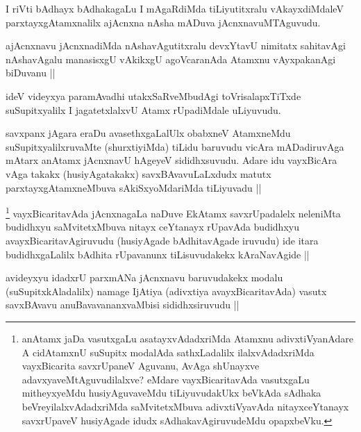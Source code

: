 
\begin{artha}
I riVti bAdhayx bAdhakagaLu I mAgaRdiMda tiLiyutitxralu vAkayxdiMdaleV parxtayxgAtamxnalilx ajAcnxna nAsha mADuva jAcnxnavuMTAguvudu.
\end{artha}

\begin{artha}
ajAcnxnavu jAcnxnadiMda nAshavAgutitxralu devxYtavU nimitatx sahitavAgi nAshavAgalu manasisxgU vAkikxgU agoVcaranAda Atamxnu vAyxpakanAgi biDuvanu ||
\end{artha}

\begin{artha}
ideV videyxya paramAvadhi utakxSaRveMbudAgi toVrisalapxTiTxde suSupitxyalilx I jagatetxlalxvU Atamx rUpadiMdale uLiyuvudu.
\end{artha}


\begin{artha}
savxpanx jAgara eraDu avasethxgaLalUlx obabxneV AtamxneMdu suSupitxyalilxruvaMte (shurxtiyiMda) tiLidu baruvudu vicAra mADadiruvAga mAtarx anAtamx jAcnxnavU hAgeyeV sididhxsuvudu. Adare idu vayxBicAra vAga takakx (husiyAgatakakx) savxBAvavuLaLxdudx matutx parxtayxgAtamxneMbuva sAkiSxyoMdariMda tiLiyuvadu ||
\end{artha}

\begin{artha}
\footnote{anAtamx jaDa vasutxgaLu asatayxvAdadxriMda Atamxnu adivxtiVyanAdare A cidAtamxnU suSupitx modalAda sathxLadalilx ilalxvAdadxriMda vayxBicarita savxrUpaneV Aguvanu, AvAga shUnayxve adavxyaveMtAguvudilalxve? eMdare vayxBicaritavAda vasutxgaLu mitheyxyeMdu husiyAguvaveMdu tiLiyuvudakUkx beVkAda sAdhaka beVreyilalxvAdadxriMda saMvitetxMbuva adivxtiVyavAda nitayxceYtanayx savxrUpaveV husiyAgade idudx sAdhakavAgiruvudeMdu opapxbeVku.}
vayxBicaritavAda jAcnxnagaLa naDuve EkAtamx savxrUpadalelx neleniMta budidhxyu saMvitetxMbuva nitayx ceYtanayx rUpavAda budidhxyu avayxBicaritavAgiruvudu (husiyAgade bAdhitavAgade iruvudu) ide itara budidhxgaLalilx bAdhita rUpavanunx tiLisuvudakekx kAraNavAgide ||
\end{artha}


\begin{artha}
avideyxyu idadxrU parxmANa jAcnxnavu baruvudakekx modalu (suSupitxkAladalilx) namage IjAtiya (adivxtiya avayxBicaritavAda) vasutx savxBAvavu anuBavavananxvaMbisi sididhxsiruvudu ||
\end{artha}

